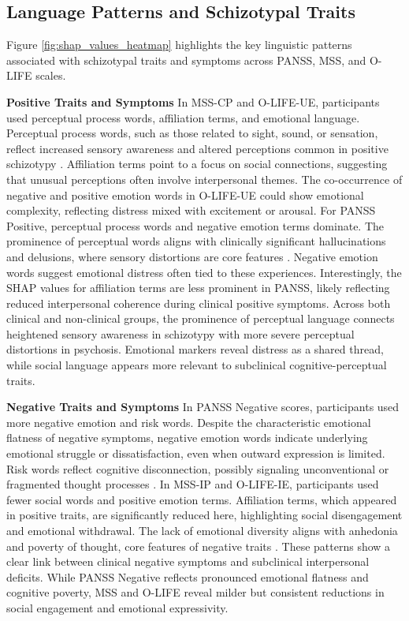\documentclass[9pt,a4paper]{rho-class/rho}
\begin{document}
\subsection{Language Patterns and Schizotypal Traits}

Figure \ref{fig:shap_values_heatmap} highlights the key linguistic patterns associated with schizotypal traits and symptoms across PANSS, MSS, and O-LIFE scales. 

\textbf{Positive Traits and Symptoms}
In MSS-CP and O-LIFE-UE, participants used perceptual process words, affiliation terms, and emotional language. Perceptual process words, such as those related to sight, sound, or sensation, reflect increased sensory awareness and altered perceptions common in positive schizotypy \cite{asimakidou2022positive}. Affiliation terms point to a focus on social connections, suggesting that unusual perceptions often involve interpersonal themes. The co-occurrence of negative and positive emotion words in O-LIFE-UE could show emotional complexity, reflecting distress mixed with excitement or arousal.
For PANSS Positive, perceptual process words and negative emotion terms dominate. The prominence of perceptual words aligns with clinically significant hallucinations and delusions, where sensory distortions are core features \cite{buck2015lexical}. Negative emotion words suggest emotional distress often tied to these experiences. Interestingly, the SHAP values for affiliation terms are less prominent in PANSS, likely reflecting reduced interpersonal coherence during clinical positive symptoms. Across both clinical and non-clinical groups, the prominence of perceptual language connects heightened sensory awareness in schizotypy with more severe perceptual distortions in psychosis. Emotional markers reveal distress as a shared thread, while social language appears more relevant to subclinical cognitive-perceptual traits.


\textbf{Negative Traits and Symptoms}
In PANSS Negative scores, participants used more negative emotion and risk words. Despite the characteristic emotional flatness of negative symptoms, negative emotion words indicate underlying emotional struggle or dissatisfaction, even when outward expression is limited. Risk words reflect cognitive disconnection, possibly signaling unconventional or fragmented thought processes \cite{buck2015lexical}.
In MSS-IP and O-LIFE-IE, participants used fewer social words and positive emotion terms. Affiliation terms, which appeared in positive traits, are significantly reduced here, highlighting social disengagement and emotional withdrawal. The lack of emotional diversity aligns with anhedonia and poverty of thought, core features of negative traits \cite{horan2006anhedonia}.
These patterns show a clear link between clinical negative symptoms and subclinical interpersonal deficits. While PANSS Negative reflects pronounced emotional flatness and cognitive poverty, MSS and O-LIFE reveal milder but consistent reductions in social engagement and emotional expressivity.
\end{document}
